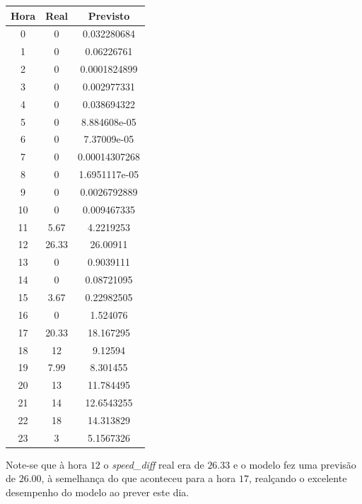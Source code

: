 \documentclass[a4paper, 12pt]{article}
\begin{document}
\begin{table}[H]
	\centering
	\begin{tabular}{||c||c|c||}
		\hline\hline
		Hora & Real&Previsto\\
		\hline\hline
		0 & 
0
 & 0.032280684 \\
		\hline
		1  &
0 & 0.06226761\\
		\hline
		2 & 0 & 0.0001824899	\\
		\hline
		3  & 
0
 & 0.002977331\\
		\hline
		4 & 0
 &0.038694322 \\
		\hline
		5  & 0
 &8.884608e-05 \\
		\hline
		6 & 0

 & 

7.37009e-05 \\
		\hline
		7 & 
0
 & 0.00014307268\\
		\hline
		8  &
0 & 1.6951117e-05\\
		\hline
		9 &  0& 0.0026792889	\\
		\hline
		10 & 

0 &0.009467335 \\
		\hline
		11  &
5.67 & 4.2219253\\
		\hline
		12 & 26.33 & 26.00911	\\
		\hline
		13  & 
0
 &0.9039111 \\
		\hline
		14 & 0
 &0.08721095 \\
		\hline
		15  & 
3.67 & 0.22982505\\
		\hline
		16 & 

0 & 
1.524076
 \\
		\hline
		17 & 
20.33
 & 18.167295 \\
		\hline
		18  &
12 & 9.12594 \\
		\hline
		19 & 7.99 & 8.301455	\\
		\hline
		20 & 
13
 &11.784495 \\
		\hline
		21  &
14 &12.6543255 \\
		\hline
		22 & 18 & 14.313829	\\
		\hline
		23  & 3

 & 5.1567326\\
		\hline\hline
	\end{tabular}
\end{table}

Note-se que à hora $12$ o \textit{speed\_diff} real era de $26.33$ e o modelo fez uma previsão de $26.00$, à semelhança do que aconteceu para a hora $17$, realçando o excelente desempenho do modelo ao prever este dia.
\end{document}
